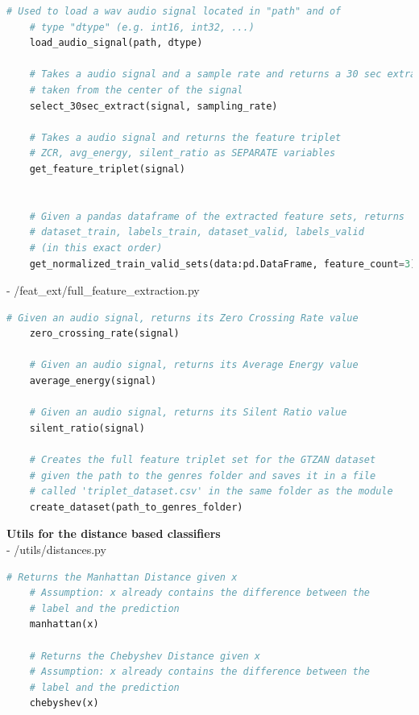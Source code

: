 \documentclass[12pt]{article}
\begin{document}
	\begin{lstlisting}[language=Python]
	# Used to load a wav audio signal located in "path" and of
	# type "dtype" (e.g. int16, int32, ...)
	load_audio_signal(path, dtype)
	
	# Takes a audio signal and a sample rate and returns a 30 sec extract
	# taken from the center of the signal
	select_30sec_extract(signal, sampling_rate)
		
	# Takes a audio signal and returns the feature triplet
	# ZCR, avg_energy, silent_ratio as SEPARATE variables
	get_feature_triplet(signal)
	
	
	# Given a pandas dataframe of the extracted feature sets, returns
	# dataset_train, labels_train, dataset_valid, labels_valid
	# (in this exact order)
	get_normalized_train_valid_sets(data:pd.DataFrame, feature_count=3)
	\end{lstlisting}

	- /feat\_ext/full\_feature\_extraction.py
	
	\begin{lstlisting}[language=Python]
	# Given an audio signal, returns its Zero Crossing Rate value
	zero_crossing_rate(signal)
		
	# Given an audio signal, returns its Average Energy value
	average_energy(signal)
		
	# Given an audio signal, returns its Silent Ratio value
	silent_ratio(signal)
		
	# Creates the full feature triplet set for the GTZAN dataset
	# given the path to the genres folder and saves it in a file
	# called 'triplet_dataset.csv' in the same folder as the module
	create_dataset(path_to_genres_folder)
	\end{lstlisting}
	\newpage
	\textbf{Utils for the distance based classifiers}\mbox{}\\
	- /utils/distances.py
	\begin{lstlisting}[language=Python]
	# Returns the Manhattan Distance given x
	# Assumption: x already contains the difference between the
	# label and the prediction
	manhattan(x)
	
	# Returns the Chebyshev Distance given x
	# Assumption: x already contains the difference between the
	# label and the prediction
	chebyshev(x)
	\end{lstlisting}
	
\end{document}
